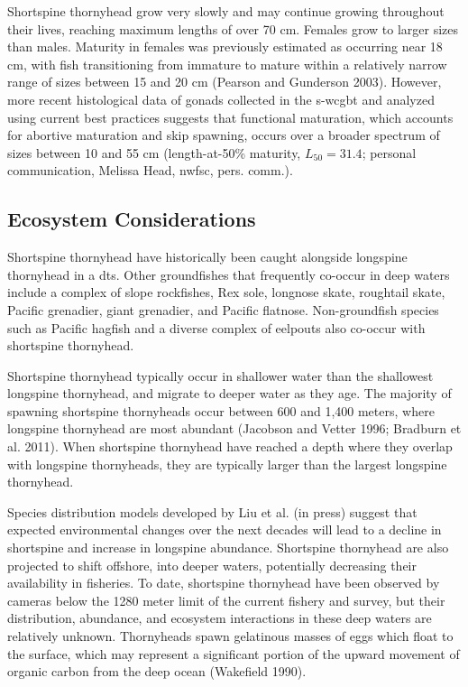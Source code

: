 \documentclass[11pt,
  english,
  letterpaper,
]{article}
\begin{document}
Shortspine thornyhead grow very slowly and may continue growing throughout their lives, reaching maximum lengths of over 70 cm. Females grow to larger sizes than males. Maturity in females was previously estimated as occurring near 18 cm, with fish transitioning from immature to mature within a relatively narrow range of sizes between 15 and 20 cm (Pearson and Gunderson 2003). However, more recent histological data of gonads collected in the \gls{s-wcgbt} and analyzed using current best practices suggests that functional maturation, which accounts for abortive maturation and skip spawning, occurs over a broader spectrum of sizes between 10 and 55 cm (length-at-50\% maturity, \(L_{50} =31.4\); personal communication, Melissa Head, \gls{nwfsc}, pers. comm.).

\hypertarget{ecosystem-considerations-1}{%
\subsection{Ecosystem Considerations}\label{ecosystem-considerations-1}}

Shortspine thornyhead have historically been caught alongside longspine thornyhead in a \gls{dts}. Other groundfishes that frequently co-occur in deep waters include a complex of slope rockfishes, Rex sole, longnose skate, roughtail skate, Pacific grenadier, giant grenadier, and Pacific flatnose. Non-groundfish species such as Pacific hagfish and a diverse complex of eelpouts also co-occur with shortspine thornyhead.

Shortspine thornyhead typically occur in shallower water than the shallowest longspine thornyhead, and migrate to deeper water as they age. The majority of spawning shortspine thornyheads occur between 600 and 1,400 meters, where longspine thornyhead are most abundant (Jacobson and Vetter 1996; Bradburn et al. 2011). When shortspine thornyhead have reached a depth where they overlap with longspine thornyheads, they are typically larger than the largest longspine thornyhead.

Species distribution models developed by Liu et al. (in press) suggest that expected environmental changes over the next decades will lead to a decline in shortspine and increase in longspine abundance. Shortspine thornyhead are also projected to shift offshore, into deeper waters, potentially decreasing their availability in fisheries. To date, shortspine thornyhead have been observed by cameras below the 1280 meter limit of the current fishery and survey, but their distribution, abundance, and ecosystem interactions in these deep waters are relatively unknown. Thornyheads spawn gelatinous masses of eggs which float to the surface, which may represent a significant portion of the upward movement of organic carbon from the deep ocean (Wakefield 1990).
\end{document}

